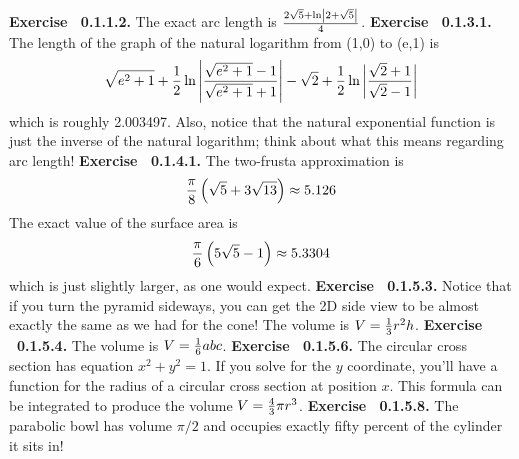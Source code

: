 \par 
 {\noindent \protect \bf  Exercise ~0.1.1.2.} The exact arc length is $\protect \frac  {2\protect \sqrt  {5}+\protect \qopname  \relax o{ln}\left | 2+\protect \sqrt  {5}\right |}{4}$. \protect \newline  \protect \newline  
 {\noindent \protect \bf  Exercise ~0.1.3.1.} The length of the graph of the natural logarithm from (1,0) to (e,1) is $$\protect \sqrt  {e^2+1}+\protect \frac  {1}{2}\protect \qopname  \relax o{ln}\left | \protect \frac  {\protect \sqrt  {e^2+1}-1}{\protect \sqrt  {e^2+1}+1}\right |-\protect \sqrt  {2}+\protect \frac  {1}{2}\protect \qopname  \relax o{ln}\left | \protect \frac  {\protect \sqrt  {2}+1}{\protect \sqrt  {2}-1}\right | $$ which is roughly 2.003497. Also, notice that the natural exponential function is just the inverse of the natural logarithm; think about what this means regarding arc length! \protect \newline  \protect \newline  
 {\noindent \protect \bf  Exercise ~0.1.4.1.} The two-frusta approximation is $$\protect \frac  {\pi }{8}\left (\protect \sqrt  {5}+3\protect \sqrt  {13} \right )\approx 5.126 $$ The exact value of the surface area is $$\protect \frac  {\pi }{6}\left (5\protect \sqrt  {5}-1 \right )\approx 5.3304 $$ which is just slightly larger, as one would expect.  \protect \newline  \protect \newline  
 {\noindent \protect \bf  Exercise ~0.1.5.3.} Notice that if you turn the pyramid sideways, you can get the 2D side view to be almost exactly the same as we had for the cone! The volume is $V=\protect \frac  {1}{3}r^2h$. \protect \newline  \protect \newline  
 {\noindent \protect \bf  Exercise ~0.1.5.4.} The volume is $V=\protect \frac  {1}{6}abc$. \protect \newline  \protect \newline  
 {\noindent \protect \bf  Exercise ~0.1.5.6.} The circular cross section has equation $x^2+y^2=1$. If you solve for the $y$ coordinate, you'll have a function for the radius of a circular cross section at position $x$. This formula can be integrated to produce the volume $V=\protect \frac  {4}{3}\pi r^3$. \protect \newline  \protect \newline  
 {\noindent \protect \bf  Exercise ~0.1.5.8.} The parabolic bowl has volume $\pi /2$ and occupies exactly fifty percent of the cylinder it sits in! \protect \newline  \protect \newline  
